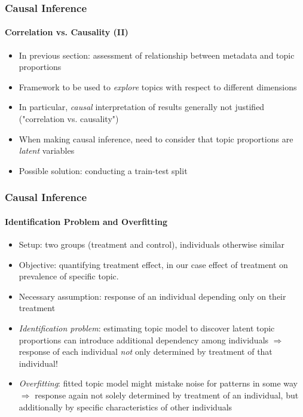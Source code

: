 \documentclass[xcolor=dvipsnames]{beamer}
\begin{document}
\begin{frame}
\frametitle{Causal Inference}
\framesubtitle{Correlation vs. Causality (II)}
\begin{itemize}
\item In previous section: assessment of relationship between metadata and topic proportions
\item Framework to be used to \textit{explore} topics with respect to different dimensions
\item In particular, \textit{causal} interpretation of results generally not justified ("correlation vs. causality")
\item When making causal inference, need to consider that topic proportions are \textit{latent} variables 
\item Possible solution: conducting a train-test split
\end{itemize}
\end{frame}

\begin{frame}
\frametitle{Causal Inference}
\framesubtitle{Identification Problem and Overfitting}
\begin{itemize}
\item Setup: two groups (treatment and control), individuals otherwise similar
\item Objective: quantifying treatment effect, in our case effect of treatment on prevalence of specific topic.
\item Necessary assumption: response of an individual depending only on their treatment
\item \textit{Identification problem}: estimating topic model to discover latent topic proportions can introduce additional dependency among individuals $\Rightarrow$ response of each individual \textit{not} only determined by treatment of that individual!
\item \textit{Overfitting}: fitted topic model might mistake noise for patterns in some way $\Rightarrow$ response again not solely determined by treatment of an individual, but additionally by specific characteristics of other individuals
\end{itemize}
\end{frame}
\end{document}
